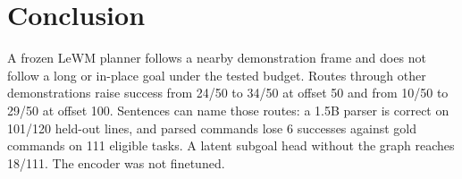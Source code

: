 \documentclass[11pt,a4paper]{article}
\begin{document}
\section{Conclusion}
A frozen LeWM planner follows a nearby demonstration frame and does not follow a long or in-place goal under the tested budget.
Routes through other demonstrations raise success from 24/50 to 34/50 at offset 50 and from 10/50 to 29/50 at offset 100.
Sentences can name those routes: a 1.5B parser is correct on 101/120 held-out lines, and parsed commands lose 6 successes against gold commands on 111 eligible tasks.
A latent subgoal head without the graph reaches 18/111.
The encoder was not finetuned.



\end{document}
